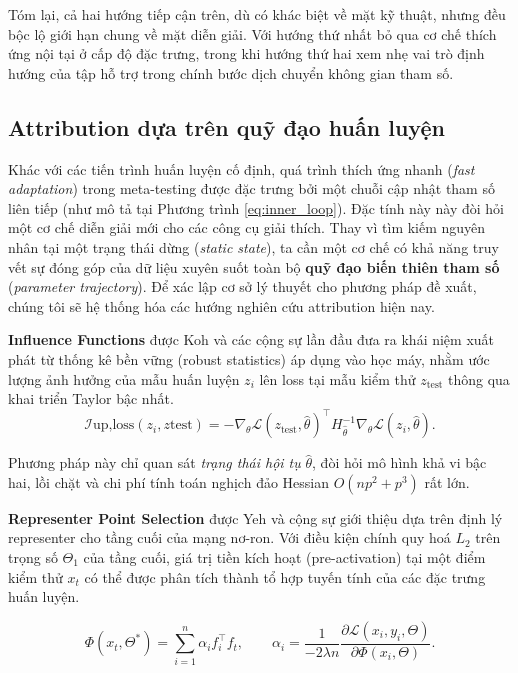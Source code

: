 Tóm lại, cả hai hướng tiếp cận trên, dù có khác biệt về mặt kỹ thuật, nhưng đều bộc lộ giới hạn chung về mặt diễn giải. Với hướng thứ nhất bỏ qua cơ chế thích ứng nội tại ở cấp độ đặc trưng, trong khi hướng thứ hai xem nhẹ vai trò định hướng của tập hỗ trợ trong chính bước dịch chuyển không gian tham số.

\subsection{Attribution dựa trên quỹ đạo huấn luyện}
\label{subsec:trajectory_attribution}

Khác với các tiến trình huấn luyện cố định, quá trình thích ứng nhanh (\textit{fast adaptation}) trong meta-testing được đặc trưng bởi một chuỗi cập nhật tham số liên tiếp (như mô tả tại Phương trình \ref{eq:inner_loop}). Đặc tính này này đòi hỏi một cơ chế diễn giải mới cho các công cụ giải thích. Thay vì tìm kiếm nguyên nhân tại một trạng thái dừng (\textit{static state}), ta cần một cơ chế có khả năng truy vết sự đóng góp của dữ liệu xuyên suốt toàn bộ \textbf{quỹ đạo biến thiên tham số} (\textit{parameter trajectory}). Để xác lập cơ sở lý thuyết cho phương pháp đề xuất, chúng tôi sẽ hệ thống hóa các hướng nghiên cứu attribution hiện nay.

\textbf{Influence Functions} được Koh và các cộng sự \cite{koh2017understanding} lần đầu đưa ra khái niệm xuất phát từ thống kê bền vững (robust statistics) áp dụng vào học máy, nhằm  ước lượng ảnh hưởng của mẫu huấn luyện $z_i$ lên loss tại mẫu kiểm thử $z_{\text{test}}$ thông qua khai triển Taylor bậc nhất.
\begin{equation}
\mathcal{I}{\text{up,loss}}(z_i, z{\text{test}}) = -\nabla_\theta \mathcal{L}(z_{\text{test}}, \hat\theta)^\top H_{\hat\theta}^{-1} \nabla_\theta \mathcal{L}(z_i, \hat\theta).
\end{equation}

Phương pháp này chỉ quan sát \emph{trạng thái hội tụ} $\hat{\theta}$, đòi hỏi mô hình khả vi bậc hai, lồi chặt và chi phí tính toán nghịch đảo Hessian $O(np^2+p^3)$ rất lớn.

\textbf{Representer Point Selection} được Yeh và cộng sự \cite{yeh2018representer} giới thiệu dựa trên định lý representer cho tầng cuối của mạng nơ-ron. Với điều kiện chính quy hoá $L_2$ trên trọng số $\Theta_1$ của tầng cuối, giá trị tiền kích hoạt (pre-activation) tại một điểm kiểm thử $x_t$ có thể được phân tích thành tổ hợp tuyến tính của các đặc trưng huấn luyện.

\begin{equation}
    \Phi(x_t, \Theta^*) = \sum_{i=1}^n \alpha_i f_i^\top f_t, \qquad \alpha_i = \frac{1}{-2\lambda n}\frac{\partial \mathcal{L}(x_i, y_i, \Theta)}{\partial \Phi(x_i, \Theta)}.
\end{equation}

